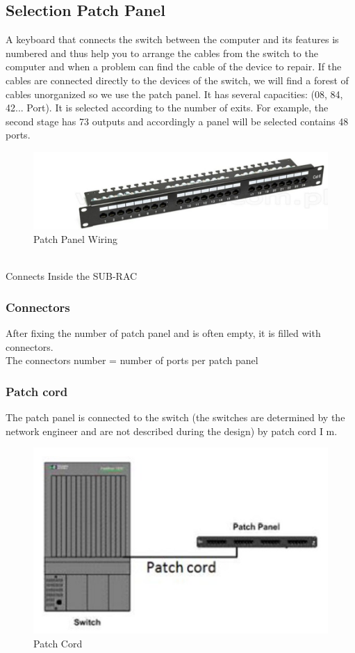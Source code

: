 \documentclass[12pt,fleqn]{book} %
\begin{document}
\subsection{Selection Patch Panel}
A keyboard that connects the switch between the computer and its features is numbered and thus help you to arrange the cables from the switch to the computer and when a problem can find the cable of the device to repair. If the cables are connected directly to the devices of the switch, we will find a forest of cables unorganized so we use the patch panel. It has several capacities: (08, 84, 42... Port). It is selected according to the number of exits. For example, the second stage has 73 outputs and accordingly a panel will be selected contains 48 ports.
\begin{figure}[!h]
    \centering
    \includegraphics[width=0.5\linewidth]{hamdy 59.png}
    \caption{Patch Panel Wiring}
    \label{fig:hamdy 59}
    \end{figure}
    \\ Connects Inside the SUB-RAC
\subsubsection{Connectors}
After fixing the number of patch panel and is often empty, it is filled with connectors.
\\ The connectors number = number of ports per patch panel
\subsubsection{Patch cord}
The patch panel is connected to the switch (the switches are determined by the network engineer and are not described during the design) by patch cord I m.
\begin{figure}[!h]
    \centering
    \includegraphics[width=0.5\linewidth]{hamdy 60.png}
    \caption{Patch Cord}
    \label{fig:hamdy 60}
    \end{figure}
\end{document}
